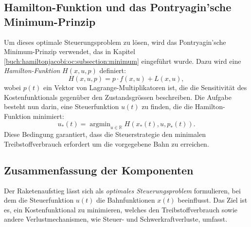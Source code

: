 \subsection{Hamilton-Funktion und das Pontryagin’sche Minimum-Prinzip}

Um dieses optimale Steuerungsproblem zu lösen, wird das Pontryagin'sche Minimum-Prinzip verwendet, das in Kapitel \ref{buch:hamiltonjacobi:oc:subsection:minimum} eingeführt wurde. Dazu wird eine \textit{Hamilton-Funktion} \(H(x,u,p)\) definiert:
\[
H(x,u,p) = p \cdot f(x,u) + L(x,u),
\]
wobei \(p(t)\) ein Vektor von Lagrange-Multiplikatoren ist, die die Sensitivität des Kostenfunktionals gegenüber den Zustandsgrössen beschreiben. Die Aufgabe besteht nun darin, eine Steuerfunktion \(u(t)\) zu finden, die die Hamilton-Funktion minimiert:
\[
u_*(t) = \operatorname{argmin}_{u \in \mathbb{R}} H(x_*(t), u, p_*(t)).
\]
Diese Bedingung garantiert, dass die Steuerstrategie den minimalen Treibstoffverbrauch erfordert um die vorgegebene Bahn zu erreichen.

\subsection{Zusammenfassung der Komponenten}
%
%

Der Raketenaufstieg lässt sich als \textit{optimales Steuerungsproblem} formulieren, bei dem die Steuerfunktion \( u(t) \) die Bahnfunktionen \( x(t) \) beeinflusst. 
Das Ziel ist es, ein Kostenfunktional zu minimieren, welches den Treibstoffverbrauch sowie andere Verlustmechanismen, wie Steuer- und Schwerkraftverluste, umfasst.


